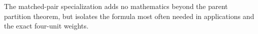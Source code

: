 The matched-pair specialization adds no mathematics beyond the parent partition theorem, but isolates the formula most often needed in applications and the exact four-unit weights.